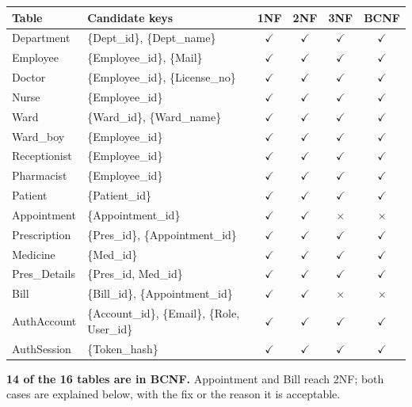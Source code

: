 \documentclass[11pt,a4paper]{article}
\newcommand{\yes}{$\checkmark$}
\newcommand{\no}{$\times$}
\begin{document}
\begin{center}
\small
\begin{tabularx}{\textwidth}{l L c c c c}
\toprule
\textbf{Table} & \textbf{Candidate keys} & \textbf{1NF} & \textbf{2NF} & \textbf{3NF} & \textbf{BCNF} \\
\midrule
Department   & \{Dept\_id\}, \{Dept\_name\}                 & \yes & \yes & \yes & \yes \\
Employee     & \{Employee\_id\}, \{Mail\}                   & \yes & \yes & \yes & \yes \\
Doctor       & \{Employee\_id\}, \{License\_no\}            & \yes & \yes & \yes & \yes \\
Nurse        & \{Employee\_id\}                             & \yes & \yes & \yes & \yes \\
Ward         & \{Ward\_id\}, \{Ward\_name\}                 & \yes & \yes & \yes & \yes \\
Ward\_boy    & \{Employee\_id\}                             & \yes & \yes & \yes & \yes \\
Receptionist & \{Employee\_id\}                             & \yes & \yes & \yes & \yes \\
Pharmacist   & \{Employee\_id\}                             & \yes & \yes & \yes & \yes \\
Patient      & \{Patient\_id\}                              & \yes & \yes & \yes & \yes \\
Appointment  & \{Appointment\_id\}                          & \yes & \yes & \no  & \no  \\
Prescription & \{Pres\_id\}, \{Appointment\_id\}            & \yes & \yes & \yes & \yes \\
Medicine     & \{Med\_id\}                                  & \yes & \yes & \yes & \yes \\
Pres\_Details & \{Pres\_id, Med\_id\}                       & \yes & \yes & \yes & \yes \\
Bill         & \{Bill\_id\}, \{Appointment\_id\}            & \yes & \yes & \no  & \no  \\
AuthAccount  & \{Account\_id\}, \{Email\}, \{Role, User\_id\} & \yes & \yes & \yes & \yes \\
AuthSession  & \{Token\_hash\}                              & \yes & \yes & \yes & \yes \\
\bottomrule
\end{tabularx}
\end{center}

\textbf{14 of the 16 tables are in BCNF.} Appointment and Bill reach 2NF; both cases are explained below, with the fix or the reason it is acceptable.
\end{document}
